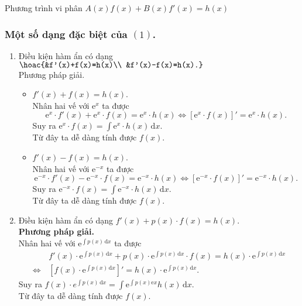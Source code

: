 \begin{dang}{Phương trình vi phân \boldmath $A(x)f(x)+B(x)f'(x)=h(x)$ \unboldmath}
	\subsubsection*{Một số dạng đặc biệt của $(1)$.}
	\begin{enumerate}
		\item Điều kiện hàm ẩn có dạng $\hoac{&f'(x)+f(x)=h(x)\\ &f'(x)-f(x)=h(x).}$\\
		      Phương pháp giải.
		      \begin{itemize}
			      \item $f'(x)+f(x)=h(x)$.\\
			            Nhân hai vế với $\mathrm{e}^x$ ta được $$\mathrm{e}^x \cdot f'(x)+\mathrm{e}^x \cdot f(x)=\mathrm{e}^x \cdot h(x) \Leftrightarrow\left[\mathrm{e}^x \cdot f(x)\right]'=\mathrm{e}^x \cdot h(x).$$
			            Suy ra $\mathrm{e}^x \cdot f(x)=\int \mathrm{e}^x \cdot h(x)  \mathrm{\,d} x$.\\
			            Từ đây ta dễ dàng tính được $f(x)$.
			      \item $f'(x)-f(x)=h(x)$.\\
			            Nhân hai vế với $\mathrm{e}^{-x}$ ta được $$\mathrm{e}^{-x} \cdot f'(x)-\mathrm{e}^{-x} \cdot f(x)=\mathrm{e}^{-x} \cdot h(x) \Leftrightarrow\left[\mathrm{e}^{-x} \cdot f(x)\right]'=\mathrm{e}^{-x} \cdot h(x).$$
			            Suy ra $\mathrm{e}^{-x} \cdot f(x)=\int \mathrm{e}^{-x} \cdot h(x)  \mathrm{\,d} x$.\\
			            Từ đây ta dễ dàng tính được $f(x)$.
		      \end{itemize}
		\item Điều kiện hàm ẩn có dạng $f'(x)+p(x)\cdot f(x)=h(x)$.\\
		      \textbf{Phương pháp giải.}\\
		      Nhân hai vế với $\mathrm{e}^{\int\limits p(x) \mathrm{\,d} x}$ ta được
		      \begin{align*}
			                      & \,f'(x) \cdot \mathrm{e}^{\int\limits p(x) \mathrm{\,d} x}+p(x) \cdot \mathrm{e}^{\int\limits p(x) \mathrm{\,d} x} \cdot f(x)=h(x) \cdot \mathrm{e}^{\int\limits p(x) \mathrm{\,d}x} \\
			      \Leftrightarrow & \, \left[f(x) \cdot \mathrm{e}^{\int\limits p(x) \mathrm{\,d} x}\right]'=h(x) \cdot \mathrm{e}^{\int\limits p(x) \mathrm{\,d} x}.
		      \end{align*}
		      Suy ra $f(x) \cdot e^{\int p(x)\mathrm{\,d} x}=\int \mathrm{e}^{\int\limits p(x) \mathrm{e} x} h(x)  \mathrm{\,d} x$.\\
		      Từ đây ta dễ dàng tính được $f(x)$.
	\end{enumerate}
\end{dang}
